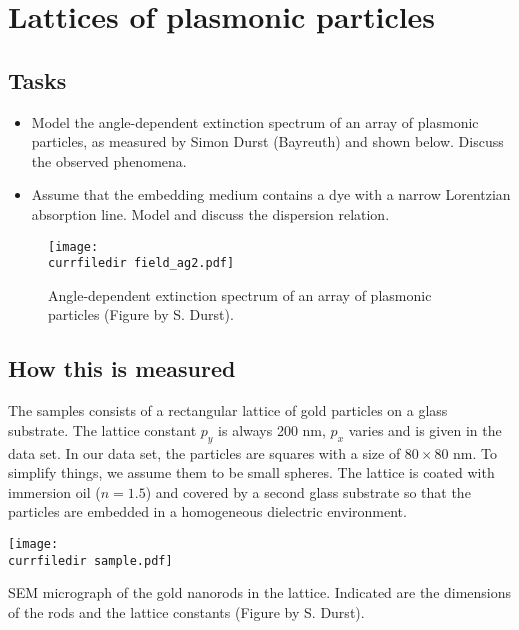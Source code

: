 \renewcommand{\lastmod}{November 18, 2021}
\renewcommand{\chapterauthors}{Markus Lippitz}


\chapter{Lattices of plasmonic particles}

\section{Tasks}

\begin{itemize}
\item Model the angle-dependent extinction spectrum of an array of plasmonic particles, as measured by Simon Durst (Bayreuth) and shown below. Discuss the observed phenomena.

\item Assume that the embedding medium contains a dye with a narrow Lorentzian absorption line. Model and discuss the dispersion relation.
\end{itemize}

\begin{figure}
\texttt{[image: \\currfiledir field\_ag2.pdf]}
\caption{Angle-dependent extinction spectrum of an array of plasmonic particles (Figure by S. Durst). \label{fig:cda_intro} }
\end{figure}

\section{How this is  measured}

The samples consists of a rectangular lattice of gold particles on a glass substrate. The lattice constant $p_y$ is always 200 nm, $p_x$ varies and is given in the data set. In our data set, the particles are squares with a size of $ 80 \times 80$ nm. To simplify things, we assume them to be small spheres. The lattice is coated with immersion oil ($n=1.5$) and covered by a second glass substrate so that the particles are embedded in a homogeneous dielectric environment.

\begin{marginfigure}
\texttt{[image: \\currfiledir sample.pdf]}
\caption{SEM micrograph of the gold nanorods in the lattice. Indicated are the dimensions of the rods and the lattice constants (Figure by S. Durst).}
\end{marginfigure}

